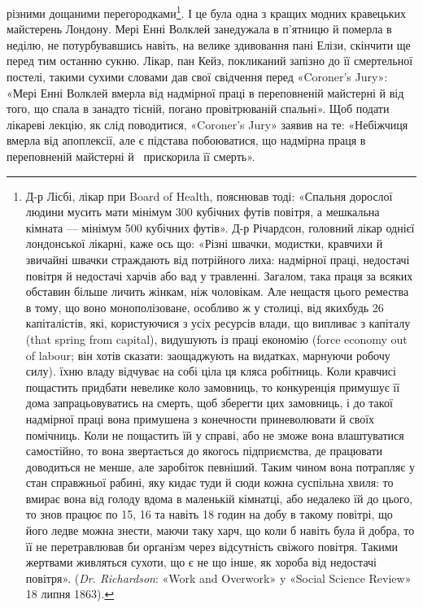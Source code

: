 різними дощаними перегородками\footnote{
Д-р Лісбі, лікар при Board of Health, пояснював тоді: «Спальня
дорослої людини мусить мати мінімум 300 кубічних футів повітря, а
мешкальна кімната — мінімум 500 кубічних футів». Д-р Річардсон,
головний лікар однієї лондонської лікарні, каже ось що: «Різні швачки,
модистки, кравчихи й звичайні швачки страждають від потрійного лиха:
надмірної праці, недостачі повітря й недостачі харчів або вад у травленні.
Загалом, така праця за всяких обставин більше личить жінкам, ніж чоловікам.
Але нещастя цього ремества в тому, що воно монополізоване, особливо
ж у столиці, від якихбудь 26 капіталістів, які, користуючися з
усіх ресурсів влади, що випливає з капіталу (that spring from capital),
видушують із праці економію (force economy out of labour; він хотів сказати:
заощаджують на видатках, марнуючи робочу силу). їхню владу
відчуває на собі ціла ця кляса робітниць. Коли кравчисі пощастить придбати
невелике коло замовниць, то конкуренція примушує її дома запрацьовуватись
на смерть, щоб зберегти цих замовниць, і до такої надмірної
праці вона примушена з конечности приневолювати й своїх помічниць.
Коли не пощастить їй у справі, або не зможе вона влаштуватися самостійно,
то вона звертається до якогось підприємства, де працювати доводиться
не менше, але заробіток певніший. Таким чином вона потрапляє у стан
справжньої рабині, яку кидає туди й сюди кожна суспільна хвиля: то вмирає
вона від голоду вдома в маленькій кімнатці, або недалеко їй до цього,
то знов працює по 15, 16 та навіть 18 годин на добу в такому повітрі, що
його ледве можна знести, маючи таку харч, що коли б навіть була й добра,
то її не перетравлював би організм через відсутність свіжого повітря.
Такими жертвами живляться сухоти, що є не що інше, як хороба від недостачі
повітря». (\emph{Dr. Richardson}: «Work and Overwork» y «Social Science
Review» 18 липня 1863).
}. І це була одна з кращих
модних кравецьких майстерень Лондону. Мері Енні Волклей
занедужала в п’ятницю й померла в неділю, не потурбувавшись
навіть, на велике здивовання пані Елізи, скінчити ще перед тим
останню сукню. Лікар, пан Кейз, покликаний запізно до її смертельної
постелі, такими сухими словами дав свої свідчення перед
«Coroner’s Jury»: «Мері Енні Волклей вмерла від надмірної праці
в переповненій майстерні й від того, що спала в занадто тісній,
погано провітрюваній спальні». Щоб подати лікареві лекцію,
як слід поводитися, «Coroner’s Jury» заявив на те: «Небіжчиця
вмерла від апоплексії, але є підстава побоюватися, що надмірна
праця в переповненій майстерні й~ прискорила її смерть».
\parbreak{}  %

